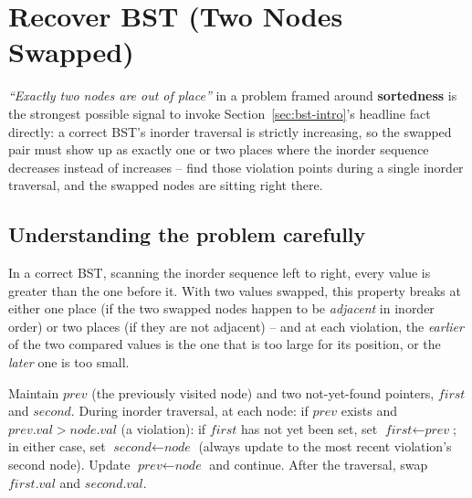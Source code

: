 \section{Recover BST (Two Nodes Swapped)}
\label{sec:bst-recover}


\begin{patternbox}
\emph{``Exactly two nodes are out of place''} in a problem framed around
\textbf{sortedness} is the strongest possible signal to invoke
Section~\ref{sec:bst-intro}'s headline fact directly: a correct BST's
inorder traversal is strictly increasing, so the swapped pair must show
up as exactly one or two places where the inorder sequence decreases
instead of increases -- find those violation points during a single
inorder traversal, and the swapped nodes are sitting right there.
\end{patternbox}

\subsection*{Understanding the problem carefully}

In a correct BST, scanning the inorder sequence left to right, every
value is greater than the one before it. With two values swapped, this
property breaks at either one place (if the two swapped nodes happen to
be \emph{adjacent} in inorder order) or two places (if they are not
adjacent) -- and at each violation, the \emph{earlier} of the two
compared values is the one that is too large for its position, or the
\emph{later} one is too small.

\begin{ideabox}
Maintain $\textit{prev}$ (the previously visited node) and two
not-yet-found pointers, $\textit{first}$ and $\textit{second}$. During
inorder traversal, at each node: if $\textit{prev}$ exists and
$\textit{prev}.\textit{val} > \textit{node}.\textit{val}$ (a violation):
if $\textit{first}$ has not yet been set, set $\textit{first} \gets
\textit{prev}$; in either case, set $\textit{second} \gets
\textit{node}$ (always update to the most recent violation's second
node). Update $\textit{prev} \gets \textit{node}$ and continue. After
the traversal, swap $\textit{first}.\textit{val}$ and
$\textit{second}.\textit{val}$.
\end{ideabox}


